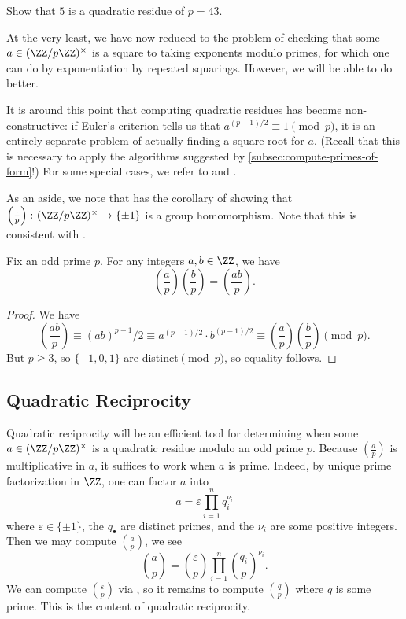 \documentclass[../notes.tex]{subfiles}
\begin{document}
\begin{exe}
	Show that $5$ is a quadratic residue of $p=43$.
\end{exe}
At the very least, we have now reduced to the problem of checking that some $a\in(\ZZ/p\ZZ)^\times$ is a square to taking exponents modulo primes, for which one can do by exponentiation by repeated squarings. However, we will be able to do better.
\begin{remark}
	It is around this point that computing quadratic residues has become non-constructive: if Euler's criterion tells us that $a^{(p-1)/2}\equiv1\pmod p$, it is an entirely separate problem of actually finding a square root for $a$. (Recall that this is necessary to apply the algorithms suggested by \cref{subsec:compute-primes-of-form}!) For some special cases, we refer to  and .
\end{remark}
As an aside, we note that  has the corollary of showing that $\left(\frac\cdot p\right)\colon(\ZZ/p\ZZ)^\times\to\{\pm1\}$ is a group homomorphism. Note that this is consistent with .
\begin{corollary} \label{cor:leg-symbol-is-char}
	Fix an odd prime $p$. For any integers $a,b\in\ZZ$, we have
	\[\left(\frac ap\right)\left(\frac bp\right)=\left(\frac{ab}p\right).\]
\end{corollary}
\begin{proof}
	We have
	\[\left(\frac{ab}p\right)\equiv(ab)^{p-1}/2\equiv a^{(p-1)/2}\cdot b^{(p-1)/2}\equiv\left(\frac ap\right)\left(\frac bp\right)\pmod p.\]
	But $p\ge3$, so $\{-1,0,1\}$ are distinct$\pmod p$, so equality follows.
\end{proof}

\subsection{Quadratic Reciprocity}
Quadratic reciprocity will be an efficient tool for determining when some $a\in(\ZZ/p\ZZ)^\times$ is a quadratic residue modulo an odd prime $p$. Because $\left(\frac ap\right)$ is multiplicative in $a$, it suffices to work when $a$ is prime. Indeed, by unique prime factorization in $\ZZ$, one can factor $a$ into
\[a=\varepsilon\prod_{i=1}^nq_i^{\nu_i}\]
where $\varepsilon\in\{\pm1\}$, the $q_\bullet$ are distinct primes, and the $\nu_i$ are some positive integers. Then we may compute $\left(\frac ap\right)$, we see
\[\left(\frac ap\right)=\left(\frac\varepsilon p\right)\prod_{i=1}^n\left(\frac{q_i}p\right)^{\nu_i}.\]
We can compute $\left(\frac\varepsilon p\right)$ via , so it remains to compute $\left(\frac qp\right)$ where $q$ is some prime. This is the content of quadratic reciprocity.
\end{document}
